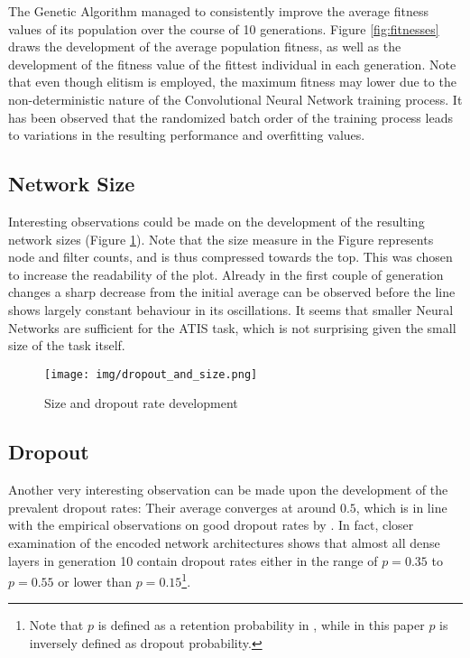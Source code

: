 \documentclass[11pt,a4paper,twoside,openright]{scrbook}
\begin{document}
The Genetic Algorithm managed to consistently improve the average fitness values of its population over the course of 10 generations. Figure \ref{fig:fitnesses} draws the development of the average population fitness, as well as the development of the fitness value of the fittest individual in each generation. Note that even though elitism is employed, the maximum fitness may lower due to the non-deterministic nature of the Convolutional Neural Network training process. It has been observed that the randomized batch order of the training process leads to variations in the resulting performance and overfitting values.
\newpage
\subsection{Network Size}

Interesting observations could be made on the development of the resulting network sizes (Figure \ref{fig:dropoutandsize}). Note that the size measure in the Figure represents node and filter counts, and is thus compressed towards the top. This was chosen to increase the readability of the plot. Already in the first couple of generation changes a sharp decrease from the initial average can be observed before the line shows largely constant behaviour in its oscillations. It seems that smaller Neural Networks are sufficient for the ATIS task, which is not surprising given the small size of the task itself.

\begin{figure}[h]
  \centering
  \texttt{[image: img/dropout\_and\_size.png]}
  \caption{Size and dropout rate development}
  \label{fig:dropoutandsize}
\end{figure}

\newpage
\subsection{Dropout}

Another very interesting observation can be made upon the development of the prevalent dropout rates: Their average converges at around \(0.5\), which is in line with the empirical observations on good dropout rates by \cite{Srivastava14}. In fact, closer examination of the encoded network architectures shows that almost all dense layers in generation 10 contain dropout rates either in the range of \(p = 0.35\) to \(p = 0.55\) or lower than \(p = 0.15\)\footnote{Note that \(p\) is defined as a retention probability in \cite{Srivastava14}, while in this paper \(p\) is inversely defined as dropout probability.}.
\end{document}
